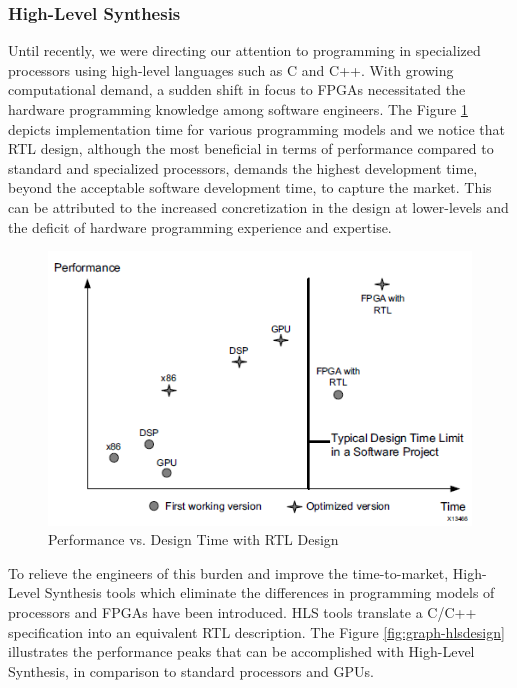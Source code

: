 \subsubsection{High-Level Synthesis}
\label{2_3_2_1}
Until recently, we were directing our attention to programming in specialized processors using high-level languages such as C and C++. With growing computational demand, a sudden shift in focus to FPGAs necessitated the hardware programming knowledge among software engineers. \newline \newline
The Figure \ref{fig:graph-rtldesign} depicts implementation time for various programming models and we notice that RTL design, although the most beneficial in terms of performance compared to standard and specialized processors, demands the highest development time, beyond the acceptable software development time, to capture the market. This can be attributed to the increased concretization in the design at lower-levels and the deficit of hardware programming experience and expertise.
\begin{figure}[h!]
  \centering
  \includegraphics[width=0.8\linewidth]{figures/graph-rtldesign.png}
  \caption{Performance vs. Design Time with RTL Design
  \cite{xil_hls}}
  \label{fig:graph-rtldesign}
\end{figure}
To relieve the engineers of this burden and improve the time-to-market, High-Level Synthesis tools which eliminate the differences in programming models of processors and FPGAs have been introduced. HLS tools translate a C/C++ specification into an equivalent RTL description. The Figure \ref{fig:graph-hlsdesign} illustrates the performance peaks that can be accomplished with High-Level Synthesis, in comparison to standard processors and GPUs. 
